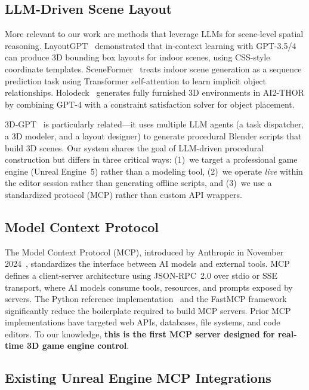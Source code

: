 \documentclass[conference]{IEEEtran}
\begin{document}
\subsection{LLM-Driven Scene Layout}

More relevant to our work are methods that leverage LLMs for scene-level spatial reasoning. LayoutGPT~\cite{feng2024layoutgpt} demonstrated that in-context learning with GPT-3.5/4 can produce 3D bounding box layouts for indoor scenes, using CSS-style coordinate templates. SceneFormer~\cite{wang2021sceneformer} treats indoor scene generation as a sequence prediction task using Transformer self-attention to learn implicit object relationships. Holodeck~\cite{yang2024holodeck} generates fully furnished 3D environments in AI2-THOR by combining GPT-4 with a constraint satisfaction solver for object placement.

3D-GPT~\cite{sun2024threedgpt} is particularly related---it uses multiple LLM agents (a task dispatcher, a 3D modeler, and a layout designer) to generate procedural Blender scripts that build 3D scenes. Our system shares the goal of LLM-driven procedural construction but differs in three critical ways: (1)~we target a professional game engine (Unreal Engine~5) rather than a modeling tool, (2)~we operate \textit{live} within the editor session rather than generating offline scripts, and (3)~we use a standardized protocol (MCP) rather than custom API wrappers.

\subsection{Model Context Protocol}

The Model Context Protocol (MCP), introduced by Anthropic in November 2024~\cite{anthropic2024mcp}, standardizes the interface between AI models and external tools. MCP defines a client-server architecture using JSON-RPC~2.0 over stdio or SSE transport, where AI models consume tools, resources, and prompts exposed by servers. The Python reference implementation~\cite{mcppythonsdk2024} and the FastMCP framework~\cite{fastmcp2025} significantly reduce the boilerplate required to build MCP servers. Prior MCP implementations have targeted web APIs, databases, file systems, and code editors. To our knowledge, \textbf{this is the first MCP server designed for real-time 3D game engine control}.

\subsection{Existing Unreal Engine MCP Integrations}
\end{document}
